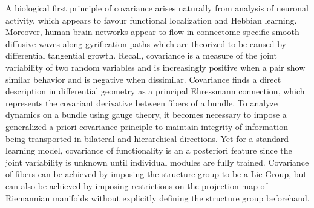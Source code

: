\documentclass{article}
\begin{document}
    
   A biological first principle of covariance arises naturally from analysis of neuronal activity, which appears to favour functional localization and Hebbian learning.
    Moreover, human brain networks appear to flow in connectome-specific smooth diffusive waves along gyrification paths which are theorized to be caused by differential tangential growth. 
    Recall, covariance is a measure of the joint variability of two random variables and is increasingly positive when a pair show similar behavior and is negative when dissimilar.
    Covariance finds a direct description in differential geometry as a principal Ehressmann connection, which represents the covariant derivative between fibers of a bundle. To analyze dynamics on a bundle using gauge theory, it becomes necessary to impose a generalized a priori covariance principle to maintain integrity of information being transported in bilateral and hierarchical directions.
    Yet for a standard learning model, covariance of functionality is an a posteriori feature since the joint variability is unknown until individual modules are fully trained. 
    Covariance of fibers can be achieved by imposing the structure group to be a Lie Group, but can also be achieved by imposing restrictions on the projection map of Riemannian manifolds without explicitly defining the structure group beforehand.
    
    

    
    
\end{document}
